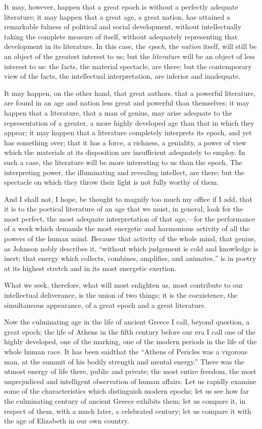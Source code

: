 It may, however, happen that a great epoch is without a perfectly
adequate literature; it may happen that a great age, a great nation, has
attained a remarkable fulness of political and social development,
without intellectually taking the complete measure of itself, without
adequately representing that development in its literature. In this
case, the \emph{epoch}, the \emph{nation} itself, will still be an
object of the greatest interest to us; but the \emph{literature} will be
an object of less interest to us: the facts, the material spectacle, are
there; but the contemporary view of the facts, the intellectual
interpretation, are inferior and inadequate.

It may happen, on the other hand, that great authors, that a powerful
literature, are found in an age and nation less great and powerful than
themselves; it may happen that a literature, that a man of genius, may
arise adequate to the representation of a greater, a more highly
developed age than that in which they appear; it may happen that a
literature completely interprets its epoch, and yet has something over;
that it has a force, a richness, a geniality, a power of view which the
materials at its disposition are insufficient adequately to employ. In
such a case, the literature will be more interesting to us than the
epoch. The interpreting power, the illuminating and revealing intellect,
are there; but the spectacle on which they throw their light is not
fully worthy of them.

And I shall not, I hope, be thought to magnify too much my office if I
add, that it is to the poetical literature of an age that we must, in
general, look for the most perfect, the most adequate interpretation of
that age,---for the performance of a work which demands the most
energetic and harmonious activity of all the powers of the human mind.
Because that activity of the whole mind, that genius, as Johnson nobly
describes it, ``without which judgement is cold and knowledge is inert;
that energy which collects, combines, amplifies, and animates,'' is in
poetry at its highest stretch and in its most energetic exertion.

What we seek, therefore, what will most enlighten us, most contribute to
our intellectual deliverance, is the union of two things; it is the
coexistence, the simultaneous appearance, of a great epoch and a great
literature.

Now the culminating age in the life of ancient Greece I call, beyond
question, a great epoch; the life of Athens in the fifth century before
our era I call one of the highly developed, one of the marking, one of
the modern periods in the life of the whole human race. It has been
saidthat the ``Athens of Pericles was a vigorous man, at the summit of
his bodily strength and mental energy.'' There was the utmost energy of
life there, public and private; the most entire freedom, the most
unprejudiced and intelligent observation of human affairs. Let us
rapidly examine some of the characteristics which distinguish modern
epochs; let us see how far the culminating century of ancient Greece
exhibits them; let us compare it, in respect of them, with a much later,
a celebrated century; let us compare it with the age of Elizabeth in our
own country.

